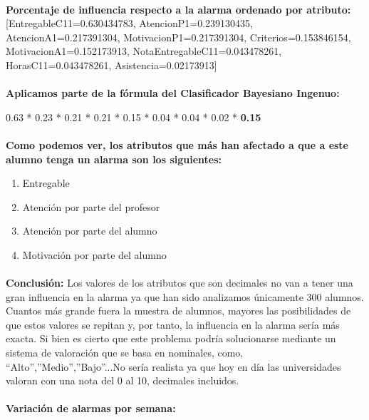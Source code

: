 \paragraph{}
\textbf{Porcentaje de influencia respecto a la alarma ordenado por atributo:}
[EntregableC11=0.630434783, AtencionP1=0.239130435, AtencionA1=0.217391304, 
MotivacionP1=0.217391304, Criterios=0.153846154, MotivacionA1=0.152173913, 
NotaEntregableC11=0.043478261, HorasC11=0.043478261, Asistencia=0.02173913]

\paragraph{}
\textbf{Aplicamos parte de la fórmula del Clasificador Bayesiano Ingenuo:}

	0.63 * 0.23 * 0.21 * 0.21 * 0.15 * 0.04 * 0.04 * 0.02 * \textbf{0.15}

\paragraph{}
\textbf{Como podemos ver, los atributos que más han afectado a que a este alumno tenga un alarma son los siguientes:}
\begin{enumerate}
\item Entregable
\item Atención por parte del profesor
\item Atención por parte del alumno
\item Motivación por parte del alumno
\end{enumerate}

\paragraph{}
\textbf{Conclusión:}
Los valores de los atributos que son decimales no van a tener una gran influencia en la alarma ya que han sido analizamos únicamente 300 alumnos. Cuantos más grande fuera la muestra de alumnos, mayores las posibilidades de que estos valores se repitan y, por tanto, la influencia en la alarma sería más exacta. Si bien es cierto que este problema podría solucionarse mediante un sistema de valoración que se basa en nominales, como, “Alto”,”Medio”,”Bajo”...No sería realista ya que hoy en día las universidades valoran con una nota del 0 al 10, decimales incluidos.

\paragraph{}
\textbf{Variación de alarmas por semana:}
